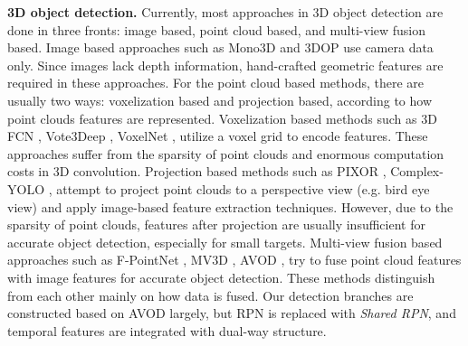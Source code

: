 \documentclass[letterpaper, 10pt, conference]{ieeeconf}  %
\begin{document}
\textbf{3D object detection.} Currently, most approaches in 3D object detection are done in three fronts: image based, point cloud based, and multi-view fusion based. Image based approaches such as Mono3D \cite{7780605} and 3DOP \cite{chen20183d} use camera data only. Since images lack depth information, hand-crafted geometric features are required in these approaches. For the point cloud based methods, there are usually two ways: voxelization based and projection based, according to how point clouds features are represented. Voxelization based methods such as 3D FCN \cite{li20173d}, Vote3Deep \cite{engelcke2017vote3deep}, VoxelNet \cite{zhou2018voxelnet}, utilize a voxel grid to encode features. These approaches suffer from the sparsity of point clouds and enormous computation costs in 3D convolution. Projection based methods such as PIXOR \cite{yang2018pixor}, Complex-YOLO \cite{simon2018complex, Simon_2019_CVPR_Workshops}, attempt to project point clouds to a perspective view (e.g. bird eye view) and apply image-based feature extraction techniques. However, due to the sparsity of point clouds, features after projection are usually insufficient for accurate object detection, especially for small targets. Multi-view fusion based approaches such as F-PointNet \cite{qi2018frustum}, MV3D \cite{chen2017multi}, AVOD \cite{ku2018joint}, try to fuse point cloud features with image features for accurate object detection. These methods distinguish from each other mainly on how data is fused. Our detection branches are constructed based on AVOD largely, but RPN is replaced with \textit{Shared RPN}, and temporal features are integrated with dual-way structure.
\end{document}
